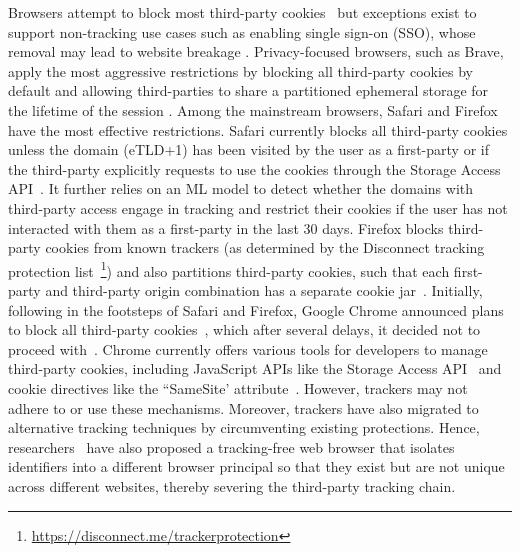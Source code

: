 %
Browsers attempt to block most third-party cookies~\cite{mdnThirdpartyCookiesPrivacy2024} but exceptions exist to support non-tracking use cases such as enabling single sign-on (SSO), whose removal may lead to website breakage \cite{crouchImprovingPrivacyBreaking2018}. 
%
Privacy-focused browsers, such as Brave, apply the most aggressive restrictions by blocking all third-party cookies by default and allowing third-parties to share a partitioned ephemeral storage for the lifetime of the session \cite{braveprivacyteamEphemeralThirdpartySite2021}. 
%
Among the mainstream browsers, Safari and Firefox have the most effective restrictions. 
%
Safari currently blocks all third-party cookies unless the domain (eTLD+1) has been visited by the user as a first-party or if the third-party explicitly requests to use the cookies through the Storage Access API~\cite{TrackingPreventionWebKit2020}. 
%
It further relies on an ML model to detect whether the domains with third-party access engage in tracking and restrict their cookies if the user has not interacted with them as a first-party in the last 30 days. 
%
Firefox blocks third-party cookies from known trackers (as determined by the Disconnect tracking protection list~\footnote{\url{https://disconnect.me/trackerprotection}}) and also partitions third-party cookies, such that each first-party and third-party origin combination has a separate cookie jar~\cite{mdnThirdpartyCookiesPrivacy2024}.
%
Initially, following in the footsteps of Safari and Firefox, Google Chrome announced plans to block all third-party cookies~\cite{chromeBuildingMorePrivate2020}, which after several delays, it decided not to proceed with~\cite{chavezNewPathPrivacy2024}. 
%
Chrome currently offers various tools for developers to manage third-party cookies, including JavaScript APIs like the Storage Access API~\cite{mdnStorageAccessAPI2024} and cookie directives like the ``SameSite' attribute~\cite{mdnSetCookieHTTPMDN2024}. 
%
However, trackers may not adhere to or use these mechanisms.
%
Moreover, trackers have also migrated to alternative tracking techniques by circumventing existing protections.
%
%
Hence, researchers~\cite{panNotKnowWhat2015} have also proposed a tracking-free web browser that isolates identifiers into a different browser principal so that they exist but are not unique across different websites, thereby severing the third-party tracking chain.



